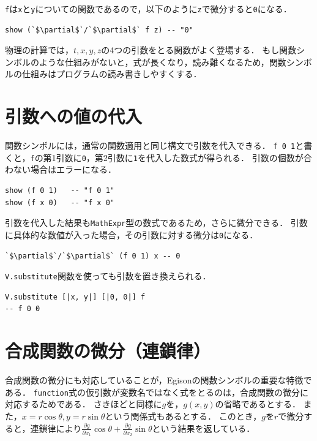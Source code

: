\lstinline{f}は\lstinline{x}と\lstinline{y}についての関数であるので，以下のように\lstinline{z}で微分すると\lstinline{0}になる．

\begin{lstlisting}[language=egison,numbers=none]
show (`$\partial$`/`$\partial$` f z) -- "0"
\end{lstlisting}

物理の計算では，$t,x,y,z$の4つの引数をとる関数がよく登場する．
もし関数シンボルのような仕組みがないと，式が長くなり，読み難くなるため，関数シンボルの仕組みはプログラムの読み書きしやすくする．

\section{引数への値の代入}\label{funcsym-apply}

関数シンボルには，通常の関数適用と同じ構文で引数を代入できる．
\lstinline{f 0 1}と書くと，\lstinline{f}の第1引数に\lstinline{0}，第2引数に\lstinline{1}を代入した数式が得られる．
引数の個数が合わない場合はエラーになる．

\begin{lstlisting}[language=egison,numbers=none]
show (f 0 1)   -- "f 0 1"
show (f x 0)   -- "f x 0"
\end{lstlisting}

引数を代入した結果も\lstinline{MathExpr}型の数式であるため，さらに微分できる．
引数に具体的な数値が入った場合，その引数に対する微分は\lstinline{0}になる．

\begin{lstlisting}[language=egison,numbers=none]
`$\partial$`/`$\partial$` (f 0 1) x -- 0
\end{lstlisting}

\lstinline{V.substitute}関数を使っても引数を置き換えられる．

\begin{lstlisting}[language=egison,numbers=none]
V.substitute [|x, y|] [|0, 0|] f
-- f 0 0
\end{lstlisting}

\section{合成関数の微分（連鎖律）}\label{funcsym-chain}

合成関数の微分にも対応していることが，Egisonの関数シンボルの重要な特徴である．
\lstinline{function}式の仮引数が変数名ではなく式をとるのは，合成関数の微分に対応するためである．
さきほどと同様に$g$を，$g(x,y)$の省略であるとする．
また，$x=r \cos \theta, y= r \sin \theta$という関係式もあるとする．
このとき，$g$を$r$で微分すると，連鎖律により$\frac{\partial g}{\partial x_1} \cos \theta + \frac{\partial g}{\partial x_2} \sin \theta$という結果を返している．

